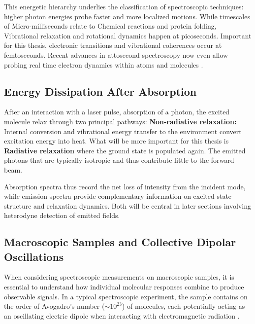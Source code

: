 \noindent
This energetic hierarchy underlies the classification of spectroscopic techniques: higher photon energies probe faster and more localized motions.
While timescales of Micro-milliseconds relate to  Chemical reactions and protein folding, Vibrational relaxation and rotational dynamics happen at picoseconds. Important for this thesis, electronic transitions and vibrational coherences occur at femtoseconds. Recent advances in attosecond spectroscopy now even allow probing real time electron dynamics within atoms and molecules \cite{rupprechtetal2025tracinglonglivedatomic}.

\subsection{Energy Dissipation After Absorption}

\noindent
After an interaction with a laser pulse, absorption of a photon, the excited molecule relax through two principal pathways:
\textbf{Non-radiative relaxation:} Internal conversion and vibrational energy transfer to the environment convert excitation energy into heat. What will be more important for this thesis is \textbf{Radiative relaxation} where the ground state is populated again. The emitted photons that are typically isotropic and thus contribute little to the forward beam.

\noindent
Absorption spectra thus record the net loss of intensity from the incident mode, while emission spectra provide complementary information on excited-state structure and relaxation dynamics. Both will be central in later sections involving heterodyne detection of emitted fields. 



\subsection{Macroscopic Samples and Collective Dipolar Oscillations}
\label{subsec:macroscopic_samples}

\noindent 
When considering spectroscopic measurements on macroscopic samples, it is essential to understand how individual molecular responses combine to produce observable signals. In a typical spectroscopic experiment, the sample contains on the order of Avogadro's number ($\sim 10^{23}$) of molecules, each potentially acting as an oscillating electric dipole when interacting with electromagnetic radiation \cite{feynman1965feynmanlecturesphysics}.

